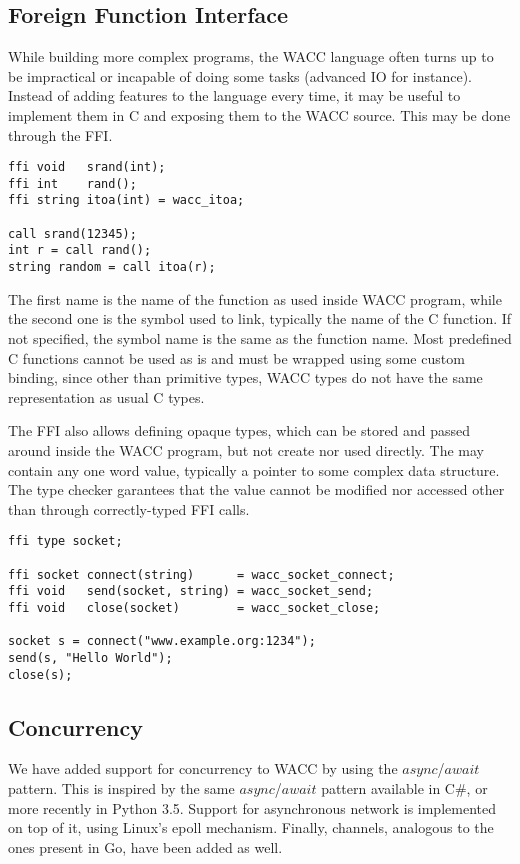 \documentclass{article}
\begin{document}
\subsection{Foreign Function Interface}
While building more complex programs, the WACC language often turns up to be impractical or incapable of doing some tasks
(advanced IO for instance). Instead of adding features to the language every time, it may be useful to implement them in C
and exposing them to the WACC source. This may be done through the FFI.

\begin{lstlisting}
ffi void   srand(int);
ffi int    rand();
ffi string itoa(int) = wacc_itoa;

call srand(12345);
int r = call rand();
string random = call itoa(r);
\end{lstlisting}

The first name is the name of the function as used inside WACC program, while the second one is the symbol used to link,
typically the name of the C function. If not specified, the symbol name is the same as the function name.
Most predefined C functions cannot be used as is and must be wrapped using some custom binding, since other than primitive
types, WACC types do not have the same representation as usual C types.

The FFI also allows defining opaque types, which can be stored and passed around inside the WACC program, but not create nor
used directly. The may contain any one word value, typically a pointer to some complex data structure. The type checker
garantees that the value cannot be modified nor accessed other than through correctly-typed FFI calls.

\begin{lstlisting}
ffi type socket;

ffi socket connect(string)      = wacc_socket_connect;
ffi void   send(socket, string) = wacc_socket_send;
ffi void   close(socket)        = wacc_socket_close;

socket s = connect("www.example.org:1234");
send(s, "Hello World");
close(s);
\end{lstlisting}

\subsection{Concurrency}
We have added support for concurrency to WACC by using the $async$/$await$ pattern. This is inspired by the same
$async$/$await$ pattern available in C\#, or more recently in Python 3.5. Support for asynchronous network is
implemented on top of it, using Linux's epoll mechanism. Finally, channels, analogous to the ones present in Go,
have been added as well.
\end{document}
